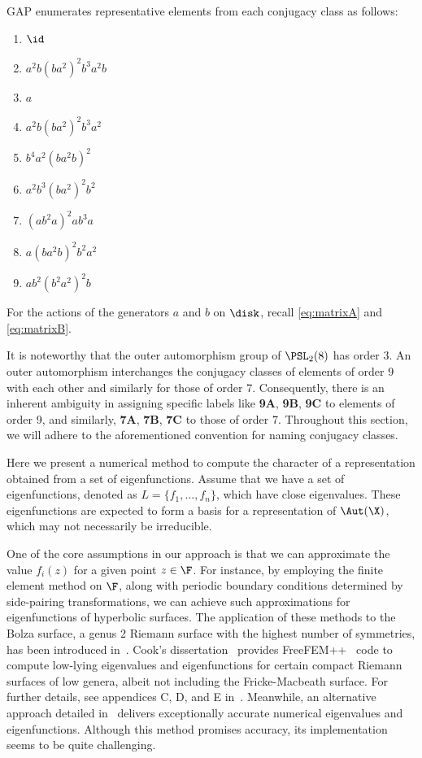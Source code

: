 GAP enumerates representative elements from each conjugacy class as follows:
\begin{enumerate}
\item[\textbf{1A.}] $\id$
\item[\textbf{2A.}] \( a^2 b (b a^2)^2 b^3 a^2 b \)
\item[\textbf{3A.}] \( a \)
\item[\textbf{7A.}] \( a^2 b (b a^2)^2 b^3 a^2 \)
\item[\textbf{7B.}] \( b^4 a^2 (b a^2 b)^2 \)
\item[\textbf{7C.}] \( a^2 b^3 (b a^2)^2 b^2 \)
\item[\textbf{9A.}] \( (a b^2 a)^2 a b^3 a \)
\item[\textbf{9B.}] \( a (b a^2 b)^2 b^2 a^2 \)
\item[\textbf{9C.}] \( a b^2 (b^2 a^2)^2 b \)
\end{enumerate}
For the actions of the generators \( a \) and \( b \) on \( \disk \), recall \eqref{eq:matrixA} and \eqref{eq:matrixB}.

It is noteworthy that the outer automorphism group of \( \PSL_2(8) \) has order 3.
An outer automorphism interchanges the conjugacy classes of elements of order 9 with each other and similarly for those of order 7.
Consequently, there is an inherent ambiguity in assigning specific labels like \textbf{9A}, \textbf{9B}, \textbf{9C} to elements of order 9, and similarly, \textbf{7A}, \textbf{7B}, \textbf{7C} to those of order 7.
Throughout this section, we will adhere to the aforementioned convention for naming conjugacy classes.

Here we present a numerical method to compute the character of a representation obtained from a set of eigenfunctions. 
Assume that we have a set of eigenfunctions, denoted as \(L = \{f_1,\dots, f_n\}\), which have close eigenvalues. 
These eigenfunctions are expected to form a basis for a representation of \(\Aut(\X)\), which may not necessarily be irreducible.

One of the core assumptions in our approach is that we can approximate the value \(f_i(z)\) for a given point \(z \in \F\).
For instance, by employing the finite element method on \(\F\), along with periodic boundary conditions determined by side-pairing transformations, we can achieve such approximations for eigenfunctions of hyperbolic surfaces.
The application of these methods to the Bolza surface, a genus 2 Riemann surface with the highest number of symmetries, has been introduced in~\cite{MR1028714}.
Cook's dissertation~\cite{cook2018} provides FreeFEM++~\cite{MR3043640} code to compute low-lying eigenvalues and eigenfunctions for certain compact Riemann surfaces of low genera, albeit not including the Fricke-Macbeath surface.
For further details, see appendices C, D, and E in~\cite{cook2018}.
Meanwhile, an alternative approach detailed in~\cite{MR3009726} delivers exceptionally accurate numerical eigenvalues and eigenfunctions.
Although this method promises accuracy, its implementation seems to be quite challenging.

